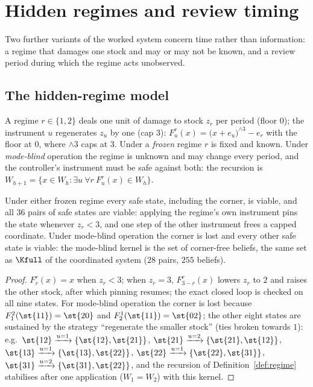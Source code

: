 \section{Hidden regimes and review timing}\label{sec:timing}

Two further variants of the worked system concern time rather than information: a regime that damages one stock and may or may not be known, and a review period during which the regime acts unobserved.

\subsection{The hidden-regime model}

\begin{definition}\label{def:regime}
A regime $r\in\{1,2\}$ deals one unit of damage to stock $z_r$ per period (floor $0$); the instrument $u$ regenerates $z_u$ by one (cap $3$):
$F^{r}_u(x)=\bigl(x+e_u\bigr)^{\wedge 3}-e_r$ with the floor at $0$, where $\wedge 3$ caps at $3$. Under a \emph{frozen} regime $r$ is fixed and known. Under \emph{mode-blind} operation the regime is unknown and may change every period, and the controller's instrument must be safe against both: the recursion is $W_{h+1}=\{x\in W_h:\exists u\ \forall r\ F^{r}_u(x)\in W_h\}$.
\end{definition}

\begin{proposition}\label{prop:regime}
Under either frozen regime every safe state, including the corner, is viable, and all $36$ pairs of safe states are viable: applying the regime's own instrument pins the state whenever $z_r<3$, and one step of the other instrument frees a capped coordinate. Under mode-blind operation the corner is lost and every other safe state is viable: the mode-blind kernel is the set of corner-free beliefs, the same set as $\Kfull$ of the coordinated system ($28$ pairs, $255$ beliefs).
\end{proposition}

\begin{proof}
$F^{r}_r(x)=x$ when $z_r<3$; when $z_r=3$, $F^{r}_{3-r}(x)$ lowers $z_r$ to $2$ and raises the other stock, after which pinning resumes; the exact closed loop is checked on all nine states. For mode-blind operation the corner is lost because $F^{2}_1(\st{11})=\st{20}$ and $F^{1}_2(\st{11})=\st{02}$; the other eight states are sustained by the strategy ``regenerate the smaller stock'' (ties broken towards $1$): e.g.\ $\st{12}\xrightarrow{u=1}\{\st{12},\st{21}\}$, $\st{21}\xrightarrow{u=2}\{\st{21},\st{12}\}$, $\st{13}\xrightarrow{u=1}\{\st{13},\st{22}\}$, $\st{22}\xrightarrow{u=1}\{\st{22},\st{31}\}$, $\st{31}\xrightarrow{u=2}\{\st{31},\st{22}\}$, and the recursion of Definition~\ref{def:regime} stabilises after one application ($W_1=W_2$) with this kernel.
\end{proof}

